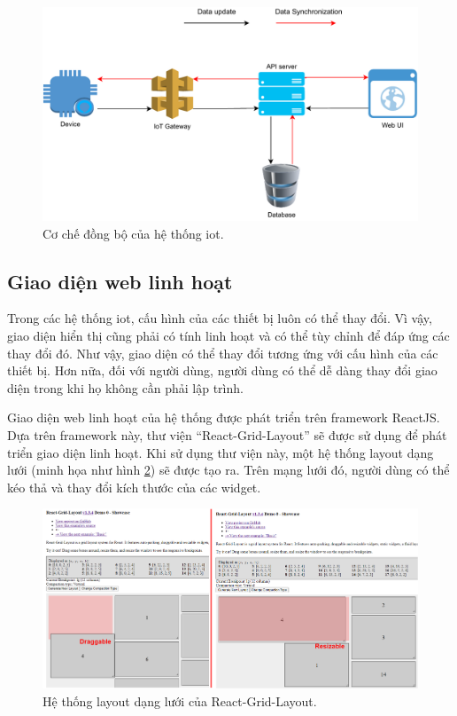 \begin{figure}[htp]
\centering
\includegraphics[width=1.0\linewidth]{images/Thesis-Page-6-sync-mecha.pdf}
\caption{Cơ chế đồng bộ của hệ thống \acrshort{iot}.}
\label{fig:sync-mechani-overview}
\end{figure}

\subsection{Giao diện web linh hoạt}

Trong các hệ thống \acrshort{iot}, cấu hình của các thiết bị luôn có thể thay đổi. Vì vậy, giao diện hiển thị cũng phải có tính linh hoạt và có thể tùy chỉnh để đáp ứng các thay đổi đó. Như vậy, giao diện có thể thay đổi tương ứng với cấu hình của các thiết bị. Hơn nữa, đối với người dùng, người dùng có thể dễ dàng thay đổi giao diện trong khi họ không cần phải lập trình.

Giao diện web linh hoạt của hệ thống được phát triển trên framework ReactJS. Dựa trên framework này, thư viện ``React-Grid-Layout'' sẽ được sử dụng để phát triển giao diện linh hoạt. Khi sử dụng thư viện này, một hệ thống layout dạng lưới (minh họa như hình \ref{fig:RGL-overview}) sẽ được tạo ra. Trên mạng lưới đó, người dùng có thể kéo thả và thay đổi kích thước của các widget.

\begin{figure}[htp]
\centering
\includegraphics[width=1.0\linewidth]{images/Thesis-Page-7-RGL-Overview.png}
\caption{Hệ thống layout dạng lưới của React-Grid-Layout.}
\label{fig:RGL-overview}
\end{figure}

